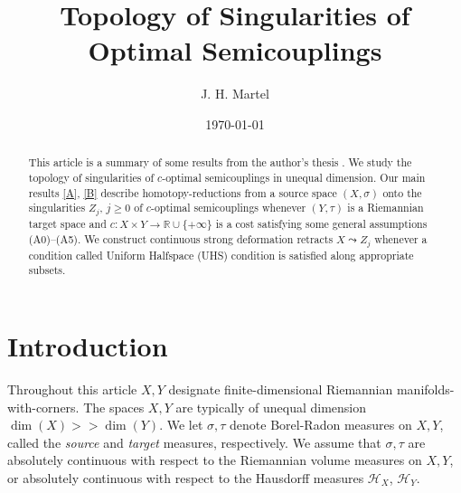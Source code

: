 \documentclass[12pt]{amsart}
\theoremstyle{definition}
\theoremstyle{remark}
\newcommand{\bR}{\mathbb{R}}
\begin{document}
\title{Topology of Singularities of Optimal Semicouplings}


\author{J. H. Martel}
\date{\today}
\maketitle

\begin{abstract}
This article is a summary of some results from the author's thesis \cite{martel}. We study the topology of singularities of $c$-optimal semicouplings in unequal dimension. Our main results \ref{A}, \ref{B} describe homotopy-reductions from a source space $(X,\sigma)$ onto the singularities $Z_j$, $j\geq 0$ of $c$-optimal semicouplings whenever $(Y, \tau)$ is a Riemannian target space and $c: X\times Y\to \bR \cup \{+\infty\}$ is a cost satisfying some general assumptions (A0)--(A5). We construct continuous strong deformation retracts $X\leadsto Z_j$ whenever a condition called Uniform Halfspace (UHS) condition is satisfied along appropriate subsets. 


\end{abstract}
\tableofcontents


\section{Introduction}


Throughout this article $X, Y$ designate finite-dimensional Riemannian manifolds-with-corners. The spaces $X, Y$ are typically of unequal dimension $\dim(X) >> \dim(Y)$. We let $\sigma, \tau$ denote Borel-Radon measures on $X,Y$, called the \emph{source} and \emph{target} measures, respectively. We assume that $\sigma, \tau$ are absolutely continuous with respect to the Riemannian volume measures on $X,Y$, or absolutely continuous with respect to the Hausdorff measures $\mathscr{H}_X$, $\mathscr{H}_Y$. 
%
\end{document}
